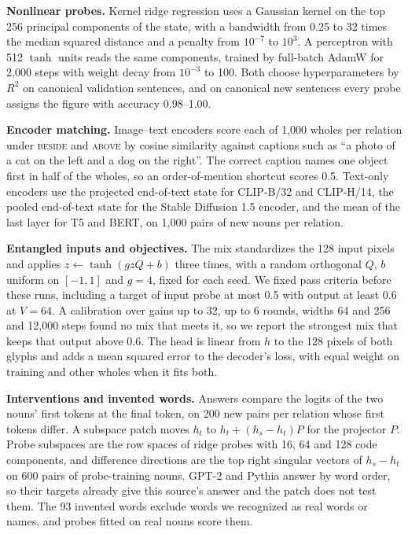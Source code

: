 \textbf{Nonlinear probes.}\label{app:e19} Kernel ridge regression uses a Gaussian kernel on the top 256 principal components of the state, with a bandwidth from 0.25 to 32 times the median squared distance and a penalty from $10^{-7}$ to $10^{3}$. A perceptron with 512 $\tanh$ units reads the same components, trained by full-batch AdamW for 2{,}000 steps with weight decay from $10^{-3}$ to 100. Both choose hyperparameters by $R^2$ on canonical validation sentences, and on canonical new sentences every probe assigns the figure with accuracy 0.98--1.00.

\textbf{Encoder matching.} Image--text encoders score each of 1{,}000 wholes per relation under \textsc{beside} and \textsc{above} by cosine similarity against captions such as ``a photo of a cat on the left and a dog on the right''. The correct caption names one object first in half of the wholes, so an order-of-mention shortcut scores 0.5. Text-only encoders use the projected end-of-text state for CLIP-B/32 and CLIP-H/14, the pooled end-of-text state for the Stable Diffusion 1.5 encoder, and the mean of the last layer for T5 and BERT, on 1{,}000 pairs of new nouns per relation.

\textbf{Entangled inputs and objectives.} The mix standardizes the 128 input pixels and applies $z \leftarrow \tanh(g z Q + b)$ three times, with a random orthogonal $Q$, $b$ uniform on $[-1, 1]$ and $g = 4$, fixed for each seed. We fixed pass criteria before these runs, including a target of input probe at most 0.5 with output at least 0.6 at $V = 64$. A calibration over gains up to 32, up to 6 rounds, widths 64 and 256 and 12{,}000 steps found no mix that meets it, so we report the strongest mix that keeps that output above 0.6. The head is linear from $h$ to the 128 pixels of both glyphs and adds a mean squared error to the decoder's loss, with equal weight on training and other wholes when it fits both.

\textbf{Interventions and invented words.} Answers compare the logits of the two nouns' first tokens at the final token, on 200 new pairs per relation whose first tokens differ. A subspace patch moves $h_t$ to $h_t + (h_s - h_t) P$ for the projector $P$. Probe subspaces are the row spaces of ridge probes with 16, 64 and 128 code components, and difference directions are the top right singular vectors of $h_s - h_t$ on 600 pairs of probe-training nouns. GPT-2 and Pythia answer by word order, so their targets already give this source's answer and the patch does not test them. The 93 invented words exclude words we recognized as real words or names, and probes fitted on real nouns score them.

